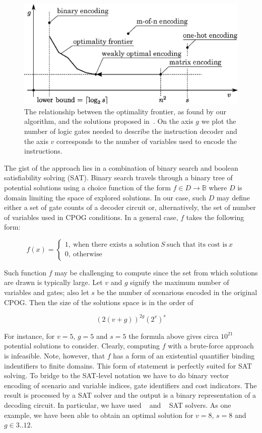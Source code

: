 \begin{figure}[t]
\centering
\includegraphics[scale=0.7]{fig/optimality_frontier}
\caption[The optimality frontier]{\label{fig:pareto}The relationship between the optimality frontier, as found by our algorithm, and the solutions proposed in~\cite{2009_mokhov_phd}. On the axis $g$ we plot the number of logic gates needed to describe the instruction decoder and the axis $v$ corresponds to the number of variables used to encode the instructions.}
\end{figure} 
 
The gist of the approach lies in a combination of binary search and boolean satisfiability solving (SAT). Binary search travels through a binary tree of potential solutions using a choice function of the form $f \in D \rightarrow \mathbb{B}$ where $D$ is domain limiting the space of explored solutions. In our case, such $D$ may define either a set of gate counts of a decoder circuit or, alternatively, the set of number of variables used in CPOG conditions. In a general case, $f$ takes the following form: 

$$f(x) = \left \{ \begin{array}{l} 1,~ \text{when there exists a solution} ~ S ~ \text{such that its cost is}~ x \\ 0,~ \text{otherwise}  \end{array} \right .$$   

\noindent
Such function $f$ may be challenging to compute since the set from which solutions are drawn is typically large. Let $v$ and $g$ signify the maximum number of variables and gates; also let $s$ be the number of scenarious encoded in the original CPOG. Then the size of the solutions space is in the order of 

$$\left (2 (v + g) \right )^{2g} \left (2^{v} \right )^{s}$$  

\noindent For instance, for $v=5$, $g=5$ and $s=5$ the formula above gives circa $10^{21}$ potential solutions to consider. Clearly, computing $f$ with a brute-force approach is infeasible. Note, however, that $f$ has a form of an existential quantifier binding indentifiers to finite domains. This form of statement is perfectly suited for SAT solving. To bridge to the SAT-level notation we have to do binary vector encoding of scenario and variable indices, gate identifiers and cost indicators. The result is processed by a SAT solver and the output is a binary representation of a decoding circuit. In particular, we have used ~\cite{2004_miniSAT_lncs} and ~\cite{clasp} SAT solvers. As one example, we have been able to obtain an optimal solution for $v=8$, $s=8$ and $g \in 3 .. 12$.     
